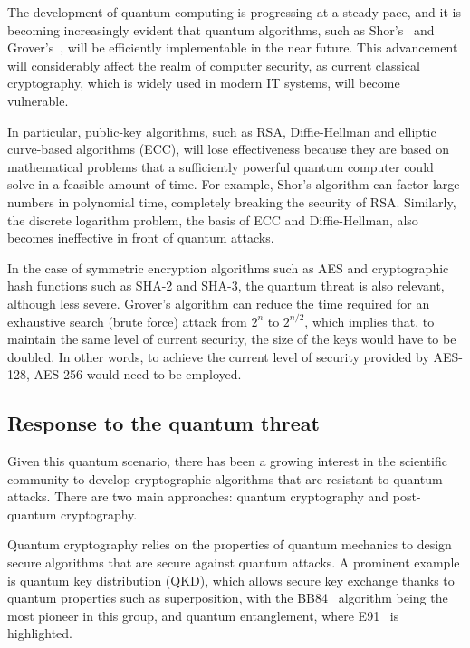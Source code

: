 \documentclass[conference]{IEEEtran}
\begin{document}

The development of quantum computing is progressing at a steady pace, and it is becoming increasingly evident that quantum algorithms, such as Shor's~\cite{Shor1999} and Grover's~\cite{Grover1996}, will be efficiently implementable in the near future. This advancement will considerably affect the realm of computer security, as current classical cryptography, which is widely used in modern IT systems, will become vulnerable.

In particular, public-key algorithms, such as RSA, Diffie-Hellman and elliptic curve-based algorithms (ECC), will lose effectiveness because they are based on mathematical problems that a sufficiently powerful quantum computer could solve in a feasible amount of time. For example, Shor's algorithm can factor large numbers in polynomial time, completely breaking the security of RSA. Similarly, the discrete logarithm problem, the basis of ECC and Diffie-Hellman, also becomes ineffective in front of quantum attacks.

In the case of symmetric encryption algorithms such as AES and cryptographic hash functions such as SHA-2 and SHA-3, the quantum threat is also relevant, although less severe. Grover's algorithm can reduce the time required for an exhaustive search (brute force) attack from \(2^n\) to \(2^{n/2}\), which implies that, to maintain the same level of current security, the size of the keys would have to be doubled. In other words, to achieve the current level of security provided by AES-128, AES-256 would need to be employed.

\subsection{Response to the quantum threat \label{subsec:resp-th}}

Given this quantum scenario, there has been a growing interest in the scientific community to develop cryptographic algorithms that are resistant to quantum attacks. There are two main approaches: quantum cryptography and post-quantum cryptography.

Quantum cryptography relies on the properties of quantum mechanics to design secure algorithms that are secure against quantum attacks. A prominent example is quantum key distribution (QKD), which allows secure key exchange thanks to quantum properties such as superposition,  with the BB84~\cite{Bennett1984} algorithm being the most pioneer in this group, and quantum entanglement, where E91~\cite{Ekert1991} is highlighted.
\end{document}
